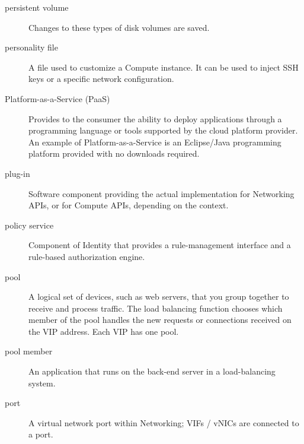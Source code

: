 \documentclass[letterpaper,10pt,english]{sphinxmanual}
\begin{document}
\begin{description}
\item[{persistent volume}] \leavevmode{}\label{_source/glossary:term-persistent-volume}
Changes to these types of disk volumes are saved.

\item[{personality file}] \leavevmode{}\label{_source/glossary:term-personality-file}
A file used to customize a Compute instance. It can be used to
inject SSH keys or a specific network configuration.

\item[{Platform-as-a-Service (PaaS)}] \leavevmode{}\label{_source/glossary:term-platform-as-a-service-paas}
Provides to the consumer the ability to deploy applications
through a programming language or tools supported by the cloud
platform provider. An example of Platform-as-a-Service is an
Eclipse/Java programming platform provided with no downloads
required.

\item[{plug-in}] \leavevmode{}\label{_source/glossary:term-plug-in}
Software component providing the actual implementation for
Networking APIs, or for Compute APIs, depending on the context.

\item[{policy service}] \leavevmode{}\label{_source/glossary:term-policy-service}
Component of Identity that provides a rule-management
interface and a rule-based authorization engine.

\item[{pool}] \leavevmode{}\label{_source/glossary:term-pool}
A logical set of devices, such as web servers, that you
group together to receive and process traffic. The load
balancing function chooses which member of the pool handles
the new requests or connections received on the VIP
address. Each VIP has one pool.

\item[{pool member}] \leavevmode{}\label{_source/glossary:term-pool-member}
An application that runs on the back-end server in a
load-balancing system.

\item[{port}] \leavevmode{}\label{_source/glossary:term-port}
A virtual network port within Networking; VIFs / vNICs are
connected to a port.


\end{description}
\end{document}
